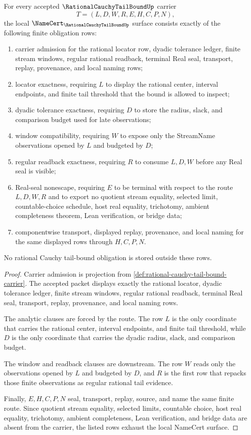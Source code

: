 \begin{theorem}
\label{thm:rational-cauchy-tail-bound-namecert-obligations}
For every accepted $\RationalCauchyTailBoundUp$ carrier
$$
T=(L,D,W,R,E,H,C,P,N),
$$
the local $\NameCert_{\RationalCauchyTailBoundUp}$ surface consists exactly of the following finite obligation rows:
\begin{enumerate}
\item carrier admission for the rational locator row, dyadic tolerance ledger, finite stream windows, regular rational readback, terminal Real seal, transport, replay, provenance, and local naming rows;
\item locator exactness, requiring $L$ to display the rational center, interval endpoints, and finite tail threshold that the bound is allowed to inspect;
\item dyadic tolerance exactness, requiring $D$ to store the radius, slack, and comparison budget used for late observations;
\item window compatibility, requiring $W$ to expose only the StreamName observations opened by $L$ and budgeted by $D$;
\item regular readback exactness, requiring $R$ to consume $L,D,W$ before any Real seal is visible;
\item Real-seal nonescape, requiring $E$ to be terminal with respect to the route $L,D,W,R$ and to export no quotient stream equality, selected limit, countable-choice schedule, host real equality, trichotomy, ambient completeness theorem, Lean verification, or bridge data;
\item componentwise transport, displayed replay, provenance, and local naming for the same displayed rows through $H,C,P,N$.
\end{enumerate}
No rational Cauchy tail-bound obligation is stored outside these rows.
\end{theorem}
\begin{proof}
Carrier admission is projection from \autoref{def:rational-cauchy-tail-bound-carrier}. The accepted packet displays exactly the rational locator, dyadic tolerance ledger, finite stream windows, regular rational readback, terminal Real seal, transport, replay, provenance, and local naming rows.

The analytic clauses are forced by the route. The row $L$ is the only coordinate that carries the rational center, interval endpoints, and finite tail threshold, while $D$ is the only coordinate that carries the dyadic radius, slack, and comparison budget.

The window and readback clauses are downstream. The row $W$ reads only the observations opened by $L$ and budgeted by $D$, and $R$ is the first row that repacks those finite observations as regular rational tail evidence.

Finally, $E,H,C,P,N$ seal, transport, replay, source, and name the same finite route. Since quotient stream equality, selected limits, countable choice, host real equality, trichotomy, ambient completeness, Lean verification, and bridge data are absent from the carrier, the listed rows exhaust the local NameCert surface.
\end{proof}

